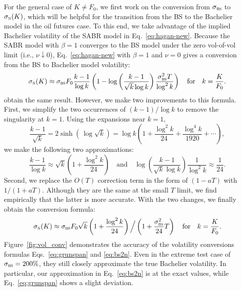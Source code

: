 \documentclass[a4paper,review]{elsarticle}
\newcommand{\qtext}[2][\quad]{#1\text{#2}#1}
\newcommand{\sigman}{\sigma_\textsc{n}}
\newcommand{\sigmabs}{\sigma_\textsc{bs}}
\newcommand{\vov}{\nu}
\begin{document}
For the general case of $K\neq F_0$, we first work on the conversion from $\sigmabs$ to $\sigman(K)$, which will be helpful for the transition from the BS to the Bachelier model in the oil futures case. To this end, we take advantage of the implied Bachelier volatility of the SABR model in Eq.~\eqref{eq:hagan-new}. Because the SABR model with $\beta=1$ converges to the BS model under the zero vol-of-vol limit (i.e., $\vov\downarrow 0$), Eq.~\eqref{eq:hagan-new} with $\beta=1$ and $\vov=0$ gives a conversion from the BS to Bachelier model volatility:
\begin{equation} \label{eq:grunspan}
\sigman(K) \approx \sigmabs F_0 \frac{k-1}{\log k} \left(1 - 
\log \left(\frac{k-1}{\sqrt{k}\log k}\right) \frac{\sigmabs^2 T}{\log^2 k}\right) \qtext{for} k=\frac{K}{F_0}.
\end{equation}
\citet[Corollary~2]{grunspan2011note} obtain the same result. However, we make two improvements to this formula. First, we simplify the two occurrences of $(k-1)/\log k$ to remove the singularity at $k=1$. Using the expansions near $k=1$,
$$\frac{k - 1}{\sqrt{k}} = 2\sinh\left(\,\log \sqrt{k}\right) = \log k \left(1+ \frac{\log^2 k}{24} +\frac{\log^4 k}{1920} + \cdots \right),
$$
we make the following two approximations:
$$ \frac{k-1}{\log k} \approx \sqrt{k}\left(1+\frac{\log^2 k}{24}\right) \qtext{and}
\log \left(\frac{k-1}{\sqrt{k}\log k}\right) \frac{1}{\log^2 k} \approx \frac{1}{24}.
$$
Second, we replace the $O(T)$ correction term in the form of $(1-aT)$ with $1/(1+aT)$. Although they are the same at the small $T$ limit, we find empirically that the latter is more accurate. 
With the two changes, we finally obtain the conversion formula:
\begin{equation} \label{eq:bs2n}
\sigman(K) \approx \sigmabs F_0 \sqrt{k}\left(1+\frac{\log^2 k}{24}\right) \Big/ \left(1 + \frac{\sigmabs^2}{24} T \right) \qtext{for} k=\frac{K}{F_0}.
\end{equation}
Figure~\ref{fig:vol_conv} demonstrates the accuracy of the volatility conversions formulas Eqs.~\eqref{eq:grunspan} and \eqref{eq:bs2n}. Even in the extreme test case of $\sigmabs=200\%$, they still closely approximate the true Bachelier volatility. In particular, our approximation in Eq.~\eqref{eq:bs2n} is at the exact values, while Eq.~\eqref{eq:grunspan} shows a slight deviation.
\end{document}
